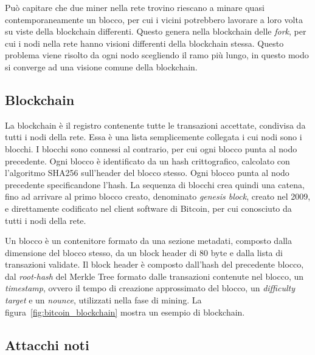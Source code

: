 Può capitare che due miner nella rete trovino riescano a minare quasi contemporaneamente un blocco, per cui i vicini potrebbero lavorare a loro volta su viste della blockchain differenti. Questo genera nella blockchain delle \emph{fork}, per cui i nodi nella rete hanno visioni differenti della blockchain stessa. Questo problema viene risolto da ogni nodo scegliendo il ramo più lungo, in questo modo si converge ad una visione comune della blockchain.


\subsection{Blockchain}\label{sec:blockchain}

La blockchain è il registro contenente tutte le transazioni accettate, condivisa da tutti i nodi della rete. Essa è una lista semplicemente collegata i cui nodi sono i blocchi. I blocchi sono connessi al contrario, per cui ogni blocco punta al nodo precedente. Ogni blocco è identificato da un hash crittografico, calcolato con l'algoritmo SHA256 sull'header del blocco stesso. Ogni blocco punta al nodo precedente specificandone l'hash. La sequenza di blocchi crea quindi una catena, fino ad arrivare al primo blocco creato, denominato \emph{genesis block}, creato nel 2009, e direttamente codificato nel client software di Bitcoin, per cui conosciuto da tutti i nodi della rete.

Un blocco è un contenitore formato da una sezione metadati, composto dalla dimensione del blocco stesso, da un block header di 80 byte e dalla lista di transazioni validate. Il block header è composto dall'hash del precedente blocco, dal \emph{root-hash} del Merkle Tree formato dalle transazioni contenute nel blocco, un \emph{timestamp}, ovvero il tempo di creazione approssimato del blocco, un \emph{difficulty target} e un \emph{nounce}, utilizzati nella fase di mining.
La figura~\ref{fig:bitcoin_blockchain} mostra un esempio di blockchain.


\subsection{Attacchi noti}\label{attacks}


